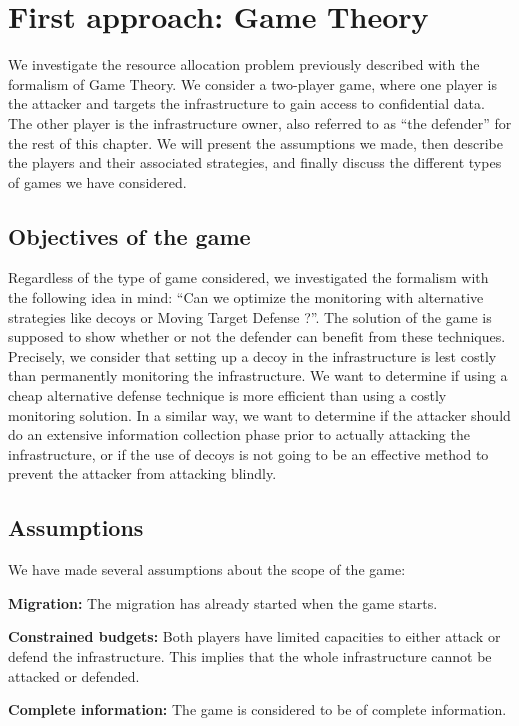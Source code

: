 \section{First approach: Game Theory}

We investigate the resource allocation problem previously described with the formalism of Game Theory.
We consider a two-player game, where one player is the attacker and targets the infrastructure to gain access to confidential data. The other player is the infrastructure owner, also referred to as ``the defender'' for the rest of this chapter.
We will present the assumptions we made, then describe the players and their associated strategies, and finally discuss the different types of games we have considered.

\subsection{Objectives of the game}
Regardless of the type of game considered, we investigated the formalism with the following idea in mind: ``Can we optimize the monitoring with alternative strategies like decoys or Moving Target Defense ?''.
The solution of the game is supposed to show whether or not the defender can benefit from these techniques. Precisely, we consider that setting up a decoy in the infrastructure is lest costly than permanently monitoring the infrastructure. We want to determine if using a cheap alternative defense technique is more efficient than using a costly monitoring solution.
In a similar way, we want to determine if the attacker should do an extensive information collection phase prior to actually attacking the infrastructure, or if the use of decoys is not going to be an effective method to prevent the attacker from attacking blindly.



\subsection{Assumptions}
We have made several assumptions about the scope of the game:
\begin{description}
\item \textbf{Migration: } The migration has already started when the game starts.
\item \textbf{Constrained budgets: } Both players have limited capacities to either attack or defend the infrastructure.
This implies that the whole infrastructure cannot be attacked or defended.
\item \textbf{Complete information: } The game is considered to be of complete information.
\end{description}

